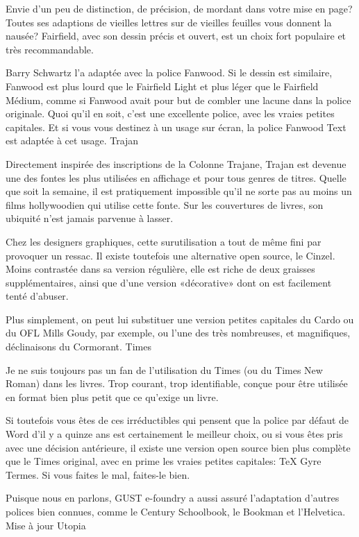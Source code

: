 \documentclass[12pt,a4paper,twocolumn]{book} %
\begin{document}
Envie d’un peu de distinction, de précision, de mordant dans votre mise en page? Toutes ses adaptions de vieilles lettres sur de vieilles feuilles vous donnent la nausée? Fairfield, avec son dessin précis et ouvert, est un choix fort populaire et très recommandable.

Barry Schwartz l’a adaptée avec la police Fanwood. Si le dessin est similaire, Fanwood est plus lourd que le Fairfield Light et plus léger que le Fairfield Médium, comme si Fanwood avait pour but de combler une lacune dans la police originale. Quoi qu’il en soit, c’est une excellente police, avec les vraies petites capitales. Et si vous vous destinez à un usage sur écran, la police Fanwood Text est adaptée à cet usage.
Trajan

Directement inspirée des inscriptions de la Colonne Trajane, Trajan est devenue une des fontes les plus utilisées en affichage et pour tous genres de titres. Quelle que soit la semaine, il est pratiquement impossible qu’il ne sorte pas au moins un films hollywoodien qui utilise cette fonte. Sur les couvertures de livres, son ubiquité n’est jamais parvenue à lasser.

Chez les designers graphiques, cette surutilisation a tout de même fini par provoquer un ressac. Il existe toutefois une alternative open source, le Cinzel. Moins contrastée dans sa version régulière, elle est riche de deux graisses supplémentaires, ainsi que d’une version «décorative» dont on est facilement tenté d’abuser.

Plus simplement, on peut lui substituer une version petites capitales du Cardo ou du OFL Mills Goudy, par exemple, ou l’une des très nombreuses, et magnifiques, déclinaisons du Cormorant.
Times

Je ne suis toujours pas un fan de l’utilisation du Times (ou du Times New Roman) dans les livres. Trop courant, trop identifiable, conçue pour être utilisée en format bien plus petit que ce qu’exige un livre.

Si toutefois vous êtes de ces irréductibles qui pensent que la police par défaut de Word d’il y a quinze ans est certainement le meilleur choix, ou si vous êtes pris avec une décision antérieure, il existe une version open source bien plus complète que le Times original, avec en prime les vraies petites capitales: TeX Gyre Termes. Si vous faites le mal, faites-le bien.

Puisque nous en parlons, GUST e-foundry a aussi assuré l’adaptation d’autres polices bien connues, comme le Century Schoolbook, le Bookman et l’Helvetica.
Mise à jour Utopia
\end{document}
